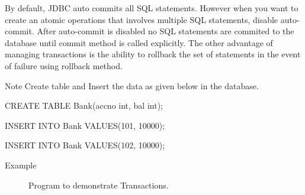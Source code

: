 \documentclass[11pt,a4paper]{article}
\begin{document}
By default, JDBC auto commits all SQL statements. However when you want to create an atomic operations that involves multiple SQL statements, disable auto-commit. After auto-commit is disabled no SQL statements are commited to the database until commit method is called explicitly. The other advantage of managing transactions is the ability to rollback the set of statements in the event of failure using rollback method.
\begin{bclogo}[couleur=blue!5, arrondi=0.3]{Note}
Create table and Insert the data as given below in the database.


CREATE TABLE Bank(accno int, bal int);

INSERT INTO Bank VALUES(101, 10000);

INSERT INTO Bank VALUES(102, 10000);
\end{bclogo}

\begin{description}
\item[Example] Program to demonstrate Transactions.

\end{description}
\end{document}
